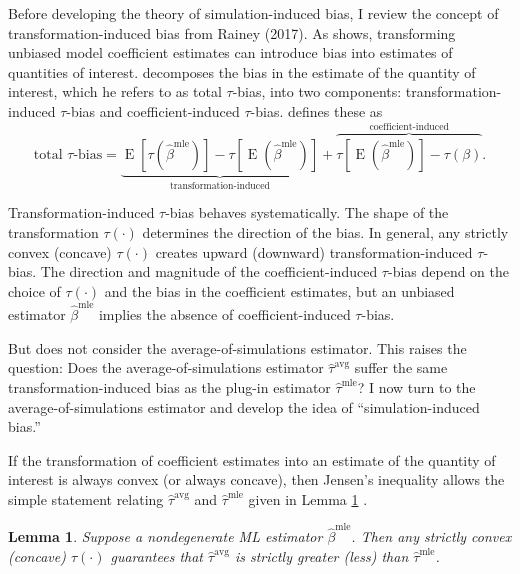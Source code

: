 \documentclass[12pt]{article}
\newtheorem{lemma}{Lemma}
\DeclareMathOperator*{\E}{\text{E}}
\begin{document}
Before developing the theory of simulation-induced bias, I review the concept of transformation-induced bias from Rainey (2017). As \citet{Rainey2017} shows, transforming unbiased model coefficient estimates can introduce bias into estimates of quantities of interest. 
\citet[p.\@ 404]{Rainey2017} decomposes the bias in the estimate of the quantity of interest, which he refers to as {total $\tau$-bias,} into two components: transformation-induced $\tau$-bias and coefficient-induced $\tau$-bias. \citet{Rainey2017} defines these as
\begin{equation}
\text{total } \tau\text{-bias}= \underbrace{ \E\left[\tau\left(\hat{\beta}^\text{mle}\right)\right]-  \tau\left[\E\left(\hat{\beta}^\text{mle}\right)\right]  }_{\text{transformation-induced}} + \overbrace{  \tau\left[\E\left(\hat{\beta}^\text{mle}\right)\right] - \tau\left(\beta\right)  }^{\text{coefficient-induced}}\text{.} \label{eqn:ti-bias}
\end{equation}

Transformation-induced $\tau$-bias behaves systematically. 
The shape of the transformation $\tau(\cdot)$ determines the direction of the bias. 
In general, any strictly convex (concave) $\tau(\cdot)$ creates upward (downward) transformation-induced $\tau$-bias.
The direction and magnitude of the coefficient-induced $\tau$-bias depend on the choice of $\tau(\cdot)$ and the bias in the coefficient estimates, but an unbiased estimator $\hat{\beta}^\text{mle}$ implies the absence of coefficient-induced $\tau$-bias. 

But \cite{Rainey2017} does not consider the average-of-simulations estimator. 
This raises the question: Does the average-of-simulations estimator $\hat{\tau}^{\text{avg}}$ suffer the same transformation-induced bias as the plug-in estimator $\hat{\tau}^\text{mle}$? I now turn to the average-of-simulations estimator and develop the idea of ``simulation-induced bias.''

If the transformation of coefficient estimates into an estimate of the quantity of interest is always convex (or always concave), then Jensen's inequality allows the simple statement relating $\hat{\tau}^\text{avg}$ and $\hat{\tau}^{\text{mle}}$ given in Lemma \ref{lem:direction} .

\begin{lemma}\label{lem:direction}
Suppose a nondegenerate ML estimator $\hat{\beta}^\text{mle}$.
Then any strictly convex (concave) $\tau(\cdot)$ guarantees that $\hat{\tau}^{\text{avg}}$ is strictly greater (less) than $\hat{\tau}^\text{mle}$.
\end{lemma}
\end{document}
